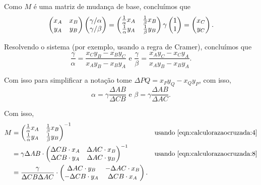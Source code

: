 \begin{sol}
  Como \(M\) é uma matriz de mudança de base, concluímos que
  \begin{equation}
    \begin{pmatrix}
        x_A& x_B \\
        y_A& y_B
    \end{pmatrix}
    \begin{pmatrix} \gamma/\alpha \\ \gamma/\beta \\  \end{pmatrix}
    = \begin{pmatrix} \frac{1}{\alpha} x_A& \frac{1}{\beta} x_B\\ \frac{1}{\alpha} y_A& \frac{1}{\beta} y_B \end{pmatrix} \gamma \begin{pmatrix} 1 \\ 1 \\  \end{pmatrix}
    = \begin{pmatrix} x_C \\ y_C \\  \end{pmatrix}.
  \end{equation}


Resolvendo o sistema (por exemplo, usando a regra de Cramer), concluímos que
\begin{equation}
  \frac{\gamma}{\alpha} = \frac{x_Cy_B-x_By_C}{x_Ay_B-x_By_A} \text{ e } \frac{\gamma}{\beta} = \frac{x_Ay_C-x_Cy_A}{x_Ay_B-x_By_A}.
\end{equation}

Com isso para simplificar a notação tome $\Delta PQ = x_Py_Q-x_Qy_P$, com isso,
\begin{equation} \label{eqn:calculorazaocruzada:8}
  \alpha = \gamma\frac{\Delta AB}{\Delta CB} \text{ e } \beta = \gamma\frac{\Delta AB}{\Delta AC}.
\end{equation}

Com isso,
\begin{align}
  M &= \begin{pmatrix} \frac{1}{\alpha} x_A& \frac{1}{\beta} x_B\\ \frac{1}{\alpha} y_A& \frac{1}{\beta} y_B \end{pmatrix}^{-1} & \text{usando \ref{eqn:calculorazaocruzada:4}} \\
    &= \gamma\Delta AB \cdot \begin{pmatrix}
    \Delta CB \cdot x_A& \Delta AC \cdot x_B \\
    \Delta CB \cdot y_A& \Delta AC \cdot y_B
  \end{pmatrix}^{-1} & \text{usando \ref{eqn:calculorazaocruzada:8}} \\
    &= \frac{\gamma}{\Delta CB \Delta AC} \cdot \begin{pmatrix}
    \Delta AC \cdot y_B & -\Delta AC \cdot x_B \\
    -\Delta CB \cdot y_A& \Delta CB \cdot x_A
  \end{pmatrix}.
\end{align}


\end{sol}
